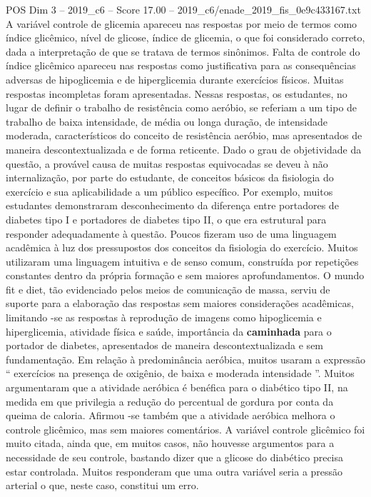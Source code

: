 \begin{textsample}{POS Dim 3 – 2019\_c6 – Score 17.00 – 2019\_c6/enade\_2019\_fis\_0e9c433167.txt}
A variável controle de glicemia apareceu nas respostas por meio de termos como índice glicêmico, nível de glicose, índice de glicemia, o que foi considerado correto, dada a interpretação de que se tratava de termos sinônimos.
Falta de controle do índice glicêmico apareceu nas respostas como justificativa para as consequências adversas de hipoglicemia e de hiperglicemia durante exercícios físicos.
Muitas respostas incompletas foram apresentadas.
Nessas respostas, os estudantes, no lugar de definir o trabalho de resistência como aeróbio, se referiam a um tipo de trabalho de baixa intensidade, de média ou longa duração, de intensidade moderada, característicos do conceito de resistência aeróbio, mas apresentados de maneira descontextualizada e de forma reticente.
Dado o grau de objetividade da questão, a provável causa de muitas respostas equivocadas se deveu à não internalização, por parte do estudante, de conceitos básicos da fisiologia do exercício e sua aplicabilidade a um público específico.
Por exemplo, muitos estudantes demonstraram desconhecimento da diferença entre portadores de diabetes tipo I e portadores de diabetes tipo II, o que era estrutural para responder adequadamente à questão.
Poucos fizeram uso de uma linguagem acadêmica à luz dos pressupostos dos conceitos da fisiologia do exercício.
Muitos utilizaram uma linguagem intuitiva e de senso comum, construída por repetições constantes dentro da própria formação e sem maiores aprofundamentos.
O mundo fit e diet, tão evidenciado pelos meios de comunicação de massa, serviu de suporte para a elaboração das respostas sem maiores considerações acadêmicas, limitando -se as respostas à reprodução de imagens como hipoglicemia e hiperglicemia, atividade física e saúde, importância da \textbf{caminhada} para o portador de diabetes, apresentados de maneira descontextualizada e sem fundamentação.
Em relação à predominância aeróbica, muitos usaram a expressão “ exercícios na presença de oxigênio, de baixa e moderada intensidade ”.
Muitos argumentaram que a atividade aeróbica é benéfica para o diabético tipo II, na medida em que privilegia a redução do percentual de gordura por conta da queima de caloria.
Afirmou -se também que a atividade aeróbica melhora o controle glicêmico, mas sem maiores comentários.
A variável controle glicêmico foi muito citada, ainda que, em muitos casos, não houvesse argumentos para a necessidade de seu controle, bastando dizer que a glicose do diabético precisa estar controlada.
Muitos responderam que uma outra variável seria a pressão arterial o que, neste caso, constitui um erro.

\end{textsample}
